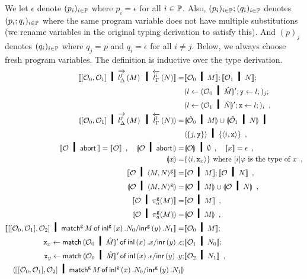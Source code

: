 We let $\epsilon$ denote $(p_i)_{i\in\mathbb{P}}$ where $p_i=\epsilon$
for all $i\in\mathbb{P}$.
Also, $(p_i)_{i\in\mathbb{P}}; (q_i)_{i\in\mathbb{P}}$ denotes
$(p_i; q_i)_{i\in\mathbb{P}}$ where the
same program variable does not have multiple substitutions
(we rename variables in the original typing derivation to satisfy this).
And $(p)_j$ denotes $(q_i)_{i\in\mathbb{P}}$ where $q_j = p$ and $q_i =
\epsilon$ for all $i\neq j$.
Below, we always choose fresh program variables.
The definition is inductive over the type derivation.
{\footnotesize
\begin{align*}
 \sem{\cotuple{\hypert_0,\hypert_1}\hmid \ltor j l \Delta M\hmid \rtol i l\Gamma N}
 =& \sem{\hypert_0\hmid M};
 \sem{\hypert_1\hmid N};\\
 &(l\leftarrow \semi{\hypert_0\hmid\hat M}'; \p
 y\leftarrow l;)_j; \\
 &(l\leftarrow \semi{\hypert_1\hmid\hat N}'; \p
 x\leftarrow l;)_i\enspace,\\
 \semi{\cotuple{\hypert_0,\hypert_1}\hmid\ltor j l \Delta M\hmid \rtol i l\Gamma N} =&
 \semi{\hat \hypert_0\hmid M} \cup \semi{\hat \hypert_1\hmid N} \hmid\\& \tuple{\{j,\p
 y\}}\hmid \{\tuple{i,\p x}\}\enspace,\\
 \sem{\hypert\hmid \abort}=\sem{\hypert}\enspace,\quad
 \semi{\hypert\hmid\abort}=&\semi{\hypert}\hmid \emptyset\enspace,\quad
 \sem{x}= \epsilon \enspace,\\
 \semi{x}=& \{\tuple{i,\p x_x}\} \text{ where $[i]\varphi$ is the type
 of $x$}\enspace,\\
 \sem{\hypert\hmid \gpair{M,N}}=&
 \sem{\hypert\hmid M}; \sem{\hypert\hmid N}\enspace,\\
 \semi{\hypert\hmid \gpair{M,N}} =&
 \semi{\hypert\hmid M}\cup \semi{\hypert\hmid N}\enspace,\\
 \sem{\hypert\hmid \pi_a^\g(M)}=&\sem{\hypert\hmid M}\enspace,\\
 \semi{\hypert\hmid\pi_a^\g(M)}=&\semi{\hypert\hmid M}\enspace,\\
  \sem{\cotuple{\cotuple{\hypert_0,\hypert_1},\hypert_2}\hmid
   \gmat  M x {N_0} y {N_1}}
 =&\sem{\hypert_0\hmid M}; \\
  \p{x}_x \leftarrow \lmat {\semi{\hypert_0\hmid \hat M}'} {x} {x} {y} {\epsilon}; &\sem{\hypert_1 \hmid N_0}; \\
  \p{x}_y \leftarrow \lmat {\semi{\hypert_0\hmid \hat M}'} {x} {\epsilon} {y} {y}; &\sem{\hypert_2 \hmid N_1}\enspace,\\
  \semi{\cotuple{\cotuple{\hypert_0,\hypert_1},\hypert_2}\hmid \gmat  M x {N_0} y {N_1}}

\end{align*}}
